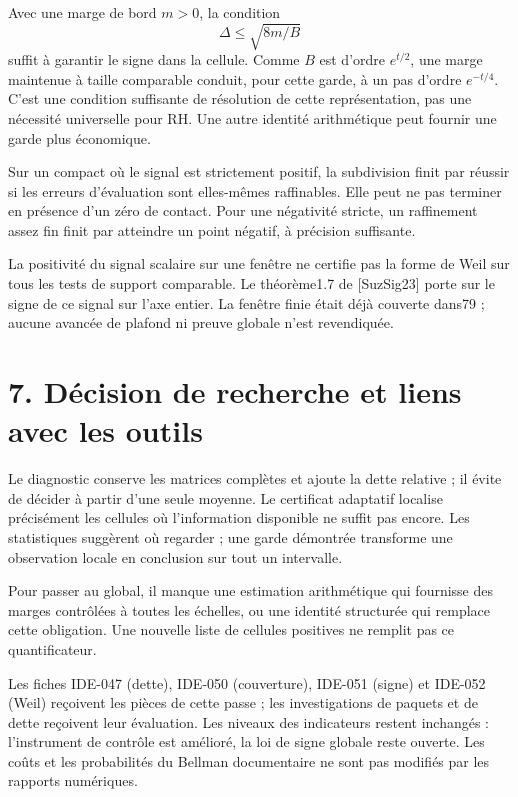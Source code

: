 \documentclass[
  11pt,
]{article}
\begin{document}
Avec une marge de bord \(m>0\), la condition \[
\Delta\le\sqrt{8m/B}
\] suffit à garantir le signe dans la cellule. Comme \(B\) est d'ordre
\(e^{t/2}\), une marge maintenue à taille comparable conduit, pour cette
garde, à un pas d'ordre \(e^{-t/4}\). C'est une condition suffisante de
résolution de cette représentation, pas une nécessité universelle pour
RH. Une autre identité arithmétique peut fournir une garde plus
économique.

Sur un compact où le signal est strictement positif, la subdivision
finit par réussir si les erreurs d'évaluation sont elles-mêmes
raffinables. Elle peut ne pas terminer en présence d'un zéro de contact.
Pour une négativité stricte, un raffinement assez fin finit par
atteindre un point négatif, à précision suffisante.

La positivité du signal scalaire sur une fenêtre ne certifie pas la
forme de Weil sur tous les tests de support comparable. Le théorème1.7
de {[}SuzSig23{]} porte sur le signe de ce signal sur l'axe entier. La
fenêtre finie était déjà couverte dans79 ; aucune avancée de plafond ni
preuve globale n'est revendiquée.

\hypertarget{duxe9cision-de-recherche-et-liens-avec-les-outils}{%
\section{7. Décision de recherche et liens avec les
outils}\label{duxe9cision-de-recherche-et-liens-avec-les-outils}}

Le diagnostic conserve les matrices complètes et ajoute la dette
relative ; il évite de décider à partir d'une seule moyenne. Le
certificat adaptatif localise précisément les cellules où l'information
disponible ne suffit pas encore. Les statistiques suggèrent où regarder
; une garde démontrée transforme une observation locale en conclusion
sur tout un intervalle.

Pour passer au global, il manque une estimation arithmétique qui
fournisse des marges contrôlées à toutes les échelles, ou une identité
structurée qui remplace cette obligation. Une nouvelle liste de cellules
positives ne remplit pas ce quantificateur.

Les fiches IDE-047 (dette), IDE-050 (couverture), IDE-051 (signe) et
IDE-052 (Weil) reçoivent les pièces de cette passe ; les investigations
de paquets et de dette reçoivent leur évaluation. Les niveaux des
indicateurs restent inchangés : l'instrument de contrôle est amélioré,
la loi de signe globale reste ouverte. Les coûts et les probabilités du
Bellman documentaire ne sont pas modifiés par les rapports numériques.
\end{document}

